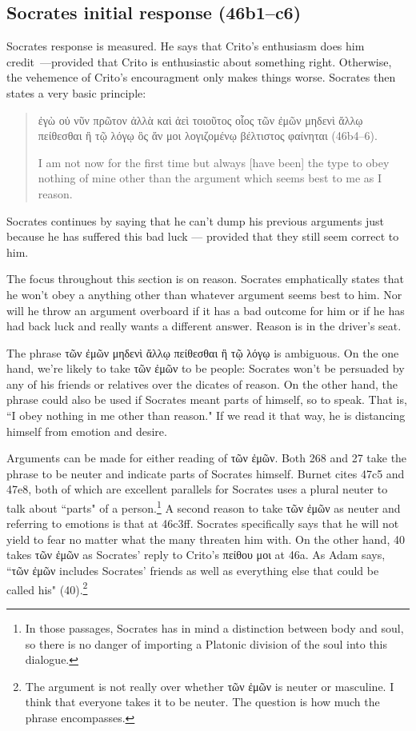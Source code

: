 \documentclass[11pt]{article}
\begin{document}

\subsection{Socrates initial response (46b1--c6)}

Socrates response is measured. He says that Crito's enthusiasm does him
credit~---provided that Crito is enthusiastic about something right. Otherwise,
the vehemence of Crito's encouragment only makes things worse.  Socrates then
states a very basic principle:

\begin{quote}
    {\g ἐγὼ οὐ νῦν πρῶτον ἀλλὰ καὶ ἀεὶ τοιοῦτος οἷος τῶν ἐμῶν μηδενὶ ἄλλῳ
    πείθεσθαι ἢ τῷ λόγῳ ὃς ἄν μοι λογιζομένῳ βέλτιστος φαίνηται} (46b4--6).

    I am not now for the first time but always [have been] the type to obey
    nothing of mine other than the argument which seems best to me as I reason.
\end{quote}

Socrates continues by saying that he can't dump his previous arguments just
because he has suffered this bad luck --- provided that they still seem correct
to him.

The focus throughout this section is on reason.  Socrates emphatically states
that he won't obey a anything other than whatever argument seems best to him.
Nor will he throw an argument overboard if it has a bad outcome for him or if
he has had back luck and really wants a different answer.  Reason is in the
driver's seat.

The phrase {\g τῶν ἐμῶν μηδενὶ ἄλλῳ πείθεσθαι ἢ τῷ λόγῳ} is ambiguous.  On the
one hand, we're likely to take {\g τῶν ἐμῶν} to be people: Socrates won't be
persuaded by any of his friends or relatives over the dicates of reason.  On
the other hand, the phrase could also be used if Socrates meant parts of
himself, so to speak. That is, ``I obey nothing in me other than reason."  If
we read it that way, he is distancing himself from emotion and desire.

Arguments can be made for either reading of {\g τῶν ἐμῶν}. Both
\citet{burnet1924} 268 and \citet{rose1983} 27 take the phrase to be neuter and
indicate parts of Socrates himself.  Burnet cites 47c5 and 47e8, both of which
are excellent parallels for Socrates uses a plural neuter to talk about
``parts" of a person.\footnote{In those passages, Socrates has in mind
a distinction between body and soul, so there is no danger of importing
a Platonic division of the soul into this dialogue.}  A second reason to take
{\g τῶν ἐμῶν} as neuter and referring to emotions is that at 46c3ff. Socrates
specifically says that he will not yield to fear no matter what the many
threaten him with.  On the other hand, \citet{adam1988} 40 takes {\g τῶν ἐμῶν}
as Socrates' reply to Crito's {\g πείθου μοι} at 46a.  As Adam says, ``{\g τῶν
ἐμῶν} includes Socrates' friends as well as everything else that could be
called his" (40).\footnote{The argument is not really over whether {\g τῶν
ἐμῶν} is neuter or masculine.  I think that everyone takes it to be neuter.
The question is how much the phrase encompasses.}
\end{document}

